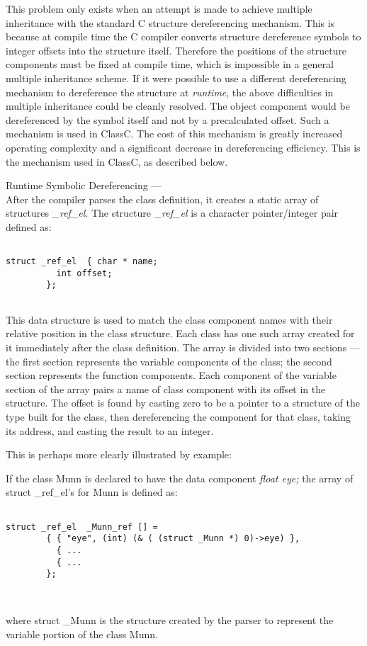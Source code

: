 This problem only exists when an attempt is made to achieve multiple
inheritance with the standard C structure dereferencing mechanism.  This is
because at compile time the C compiler converts structure dereference
symbols to integer offsets into the structure itself.
Therefore the positions of the structure components must be fixed at
compile time, which is impossible in a general multiple inheritance
scheme.
If it were possible to use a different dereferencing mechanism to dereference
the structure at
{\em runtime}, the above difficulties in multiple inheritance
could be cleanly resolved. The object component would be dereferenced
by the symbol itself and not by a precalculated offset.
Such a mechanism is used in ClassC.  The cost of
this mechanism is greatly increased operating complexity and a significant
decrease in dereferencing efficiency.  This is the mechanism used in
ClassC, as described below.

Runtime Symbolic Dereferencing ---\\
After the compiler parses the class definition, it creates a static array of
structures {\em \_ref\_el}.  The structure {\em \_ref\_el} is a character
pointer/integer pair defined as:

\begin{verbatim}

struct _ref_el	{ char * name;
		  int offset;
		};


\end{verbatim}
This data structure is used to match the class component names with
their relative position in the class structure.
Each class has one such array created for it immediately after the class
definition.  The array is divided into two sections --- the first section
represents the variable components of the class; the second section
represents the function components.  Each component of the variable
section of the array pairs a name of class component with its offset in the
structure.  The offset is found by casting zero to be a pointer to a
structure of the type built for the class, then dereferencing the component
for that class, taking  its address, and casting the result to an integer.

This is perhaps more clearly illustrated by example:

If the class Munn is declared to have the data component {\em float eye;}
the array of struct \_ref\_el's for Munn is defined as:
\begin{verbatim}

struct _ref_el  _Munn_ref [] =
		{ { "eye", (int) (& ( (struct _Munn *) 0)->eye) },
		  { ...
		  { ...
		};



\end{verbatim}
where struct \_Munn is the structure created by the parser to represent the
variable portion of the class Munn.

